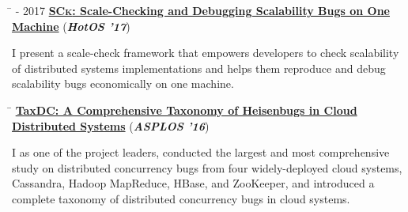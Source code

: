 \documentclass[10pt]{article} %
\begin{document}

\begin{tabbing}
\hspace{2.5cm} \=  - 2017 \>\+ \href{http://ucare.cs.uchicago.edu/pdf/hotos17-scalabilityBugs.pdf}{\textbf{\textsc{SCk}: Scale-Checking and Debugging Scalability Bugs on One Machine}} (\textit{\textbf{HotOS '17}}) \\
\begin{minipage}{\smallertextwidth}
I present a scale-check framework that empowers developers to check
scalability of distributed systems implementations and helps them reproduce
and debug scalability bugs economically on one machine. 
\end{minipage}
\end{tabbing}


\begin{tabbing}
\hspace{2.5cm} \=  \>\+ \href{http://ucare.cs.uchicago.edu/pdf/asplos16-TaxDC.pdf}{\textbf{TaxDC: A Comprehensive Taxonomy of Heisenbugs in Cloud Distributed Systems}} (\textit{\textbf{ASPLOS '16}}) \\
\begin{minipage}{\smallertextwidth}
I as one of the project leaders, conducted the largest and most comprehensive
study on distributed concurrency bugs from four widely-deployed cloud
systems, Cassandra, Hadoop MapReduce, HBase, and ZooKeeper, and introduced a
complete taxonomy of distributed concurrency bugs in cloud systems.
\end{minipage}
\end{tabbing}
\end{document}
